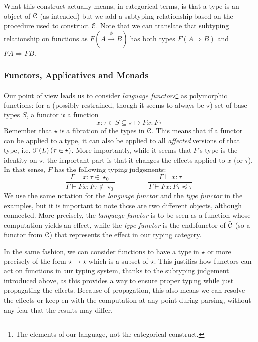 What this construct actually means, in categorical terms, is that a type is an
object of $\bar{\mathcal{C}}$ (as intended) but we add a subtyping relationship based
on the procedure used to construct $\bar{\mathcal{C}}$.
Note that we can translate that subtyping relationship on functions as
$F\left( A \xrightarrow{\phi} B \right)$ has both types
$F\left( A\Rightarrow B \right)$ and $FA \Rightarrow FB$.

\subsubsection{Functors, Applicatives and Monads}
\label{subsubsec:functors}
Our point of view leads us to consider \emph{language functors}\footnote{The
	elements of our language, not the categorical construct.} as polymorphic
functions: for a (possibly restrained, though it seems to always be $\star$)
set of base types $S$, a functor is a function
\begin{equation*}
	x: \tau\in S\subseteq \star \mapsto F x: F\tau
\end{equation*}
Remember that $\star$ is a fibration of the types in $\bar{\mathcal{C}}$.
This means that if a functor can be applied to a type, it can also be applied
to all \emph{affected} versions of that type, i.e.
$\mathcal{F}\left( L \right)(\tau\in \star)$.
More importantly, while it seems that $F$'s type is the identity on $\star$,
the important part is that it changes the effects applied to $x$ (or $\tau$).
In that sense, $F$ has the following typing judgements:
\begin{equation*}
	\frac{\Gamma\vdash x: \tau \in \star_{0}}{\Gamma\vdash F x: F\tau \notin
		\star_{0}} \hspace{2cm} \frac{\Gamma\vdash x:
		\tau}{\Gamma\vdash Fx : F\tau\preceq \tau}
\end{equation*}
We use the same notation for the \emph{language functor} and the
\emph{type functor} in the examples, but it is important to note those are two
different objects, although connected.
More precisely, the \emph{language functor} is to be seen as a function whose
computation yields an effect, while the \emph{type functor} is the endofunctor
of $\bar{\mathcal{C}}$ (so a functor from $\mathcal{C}$) that represents the effect in our
typing category.

In the same fashion, we can consider functions to have a type in $\star$ or
more precisely of the form $\star \to \star$ which is a subset of $\star$.
This justifies how functors can act on functions in our typing system, thanks
to the subtyping judgement introduced above, as this provides a way to ensure
proper typing while just propagating the effects.
Because of propagation, this also means we can resolve the effects or keep on
with the computation at any point during parsing, without any fear that the
results may differ.

